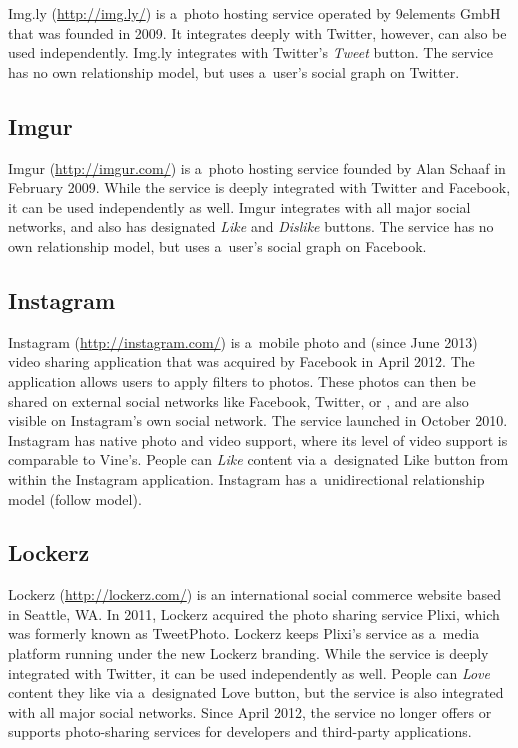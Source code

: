 Img.ly (\url{http://img.ly/})
is a~photo hosting service operated by 9elements GmbH
that was founded in 2009.
It integrates deeply with Twitter, however,
can also be used independently.
Img.ly integrates with Twitter's \emph{Tweet} button.
The service has no own relationship model,
but uses a~user's social graph on Twitter.

\subsection{Imgur}

Imgur (\url{http://imgur.com/})
is a~photo hosting service
founded by Alan Schaaf in February 2009.
While the service is deeply integrated with Twitter
and Facebook, it can be used independently as well.
Imgur integrates with all major social networks,
and also has designated \emph{Like} and \emph{Dislike} buttons.
The service has no own relationship model,
but uses a~user's social graph on Facebook.

\subsection{Instagram}
\label{sec:instagram}

Instagram (\url{http://instagram.com/})
is a~mobile photo and (since June 2013) video sharing application
that was acquired by Facebook in April 2012.
The application allows users to apply filters to photos.
These photos can then be shared on external social networks
like Facebook, Twitter, or \googleplus,
and are also visible on Instagram's own social network.
The service launched in October 2010.
Instagram has native photo and video support,
where its level of video support is comparable to Vine's.
People can \emph{Like} content via a~designated Like button
from within the Instagram application.
Instagram has a~unidirectional relationship model (follow model).

\subsection{Lockerz}

Lockerz (\url{http://lockerz.com/}) is an international
social commerce website based in Seattle, WA.
In 2011, Lockerz acquired the photo sharing service Plixi,
which was formerly known as TweetPhoto.
Lockerz keeps Plixi's service as a~media platform running
under the new Lockerz branding.
While the service is deeply integrated with Twitter,
it can be used independently as well.
People can \emph{Love} content they like via
a~designated Love button,
but the service is also integrated with all major social networks.
Since April 2012, the service no longer offers or supports
photo-sharing services for developers and third-party applications.

